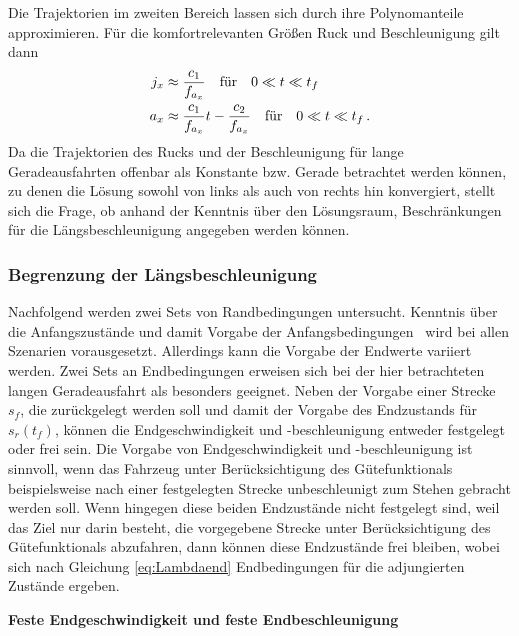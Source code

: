 Die Trajektorien im zweiten Bereich lassen sich durch ihre Polynomanteile approximieren. Für die komfortrelevanten Größen Ruck und Beschleunigung gilt dann
\begin{align}
j_x &\approx \frac{c_1}{f_{a_x}} \quad\textrm{für}\quad 0\ll t\ll t_f \label{eq:j_Bereich_2}
\\
a_x &\approx \frac{c_1}{f_{a_x}}t - \frac{c_2}{f_{a_x}} \quad\textrm{für}\quad 0\ll t\ll t_f\,. \label{eq:a_Bereich_2}
\end{align}
Da die Trajektorien des Rucks und der Beschleunigung für lange Geradeausfahrten offenbar als Konstante bzw. Gerade betrachtet werden können, zu denen die Lösung sowohl von links als auch von rechts hin konvergiert, stellt sich die Frage, ob anhand der Kenntnis über den Lösungsraum, Beschränkungen für die Längsbeschleunigung angegeben werden können. 

\subsubsection{Begrenzung der Längsbeschleunigung}\label{subsubsec:Begrenzung_ax}
Nachfolgend werden zwei Sets von Randbedingungen untersucht. Kenntnis über die Anfangszustände und damit Vorgabe der Anfangsbedingungen \xzero~wird bei allen Szenarien vorausgesetzt. Allerdings kann die Vorgabe der Endwerte variiert werden. Zwei Sets an Endbedingungen erweisen sich bei der hier betrachteten langen Geradeausfahrt als besonders geeignet. Neben der Vorgabe einer Strecke $s_f$, die zurückgelegt werden soll und damit der Vorgabe des Endzustands für $s_r(t_f)$, können die Endgeschwindigkeit und -beschleunigung entweder festgelegt oder frei sein. Die Vorgabe von Endgeschwindigkeit und -beschleunigung ist sinnvoll, wenn das Fahrzeug unter Berücksichtigung des Gütefunktionals beispielsweise nach einer festgelegten Strecke unbeschleunigt zum Stehen gebracht werden soll. Wenn hingegen diese beiden Endzustände nicht festgelegt sind, weil das Ziel nur darin besteht, die vorgegebene Strecke unter Berücksichtigung des Gütefunktionals abzufahren, dann können diese Endzustände frei bleiben, wobei sich nach Gleichung \eqref{eq:Lambdaend} Endbedingungen für die adjungierten Zustände ergeben. 

\textbf{Feste Endgeschwindigkeit und feste Endbeschleunigung}

